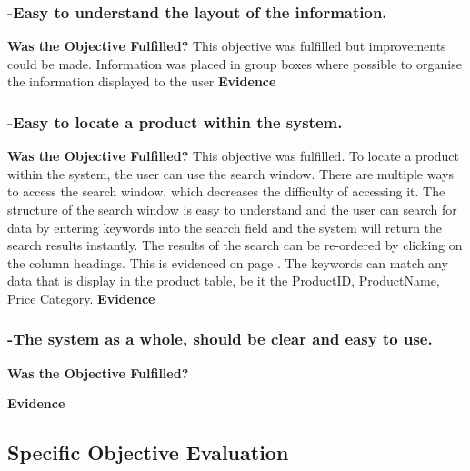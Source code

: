 \subsubsection{-Easy to understand the layout of the information.}
\textbf{Was the Objective Fulfilled?} \newline
This objective was fulfilled but improvements could be made. Information was placed in group boxes where possible to organise the information displayed to the user 
\textbf{Evidence} \newline




\subsubsection{-Easy to locate a product within the system.}
\textbf{Was the Objective Fulfilled?} \newline
This objective was fulfilled. To locate a product within the system, the user can use the search window. There are multiple ways to access the search window, which decreases the difficulty of accessing it. The structure of the search window is easy to understand and the user can search for data by entering keywords into the search field and the system will return the search results instantly. The results of the search can be re-ordered by clicking on the column headings. This is evidenced on page \pageref{}. The keywords can match any data that is display in the product table, be it the ProductID, ProductName, Price Category.
\textbf{Evidence} \newline





\subsubsection{-The system as a whole, should be clear and easy to use.}
\textbf{Was the Objective Fulfilled?} \newline

\textbf{Evidence} \newline





\subsection{Specific Objective Evaluation}


